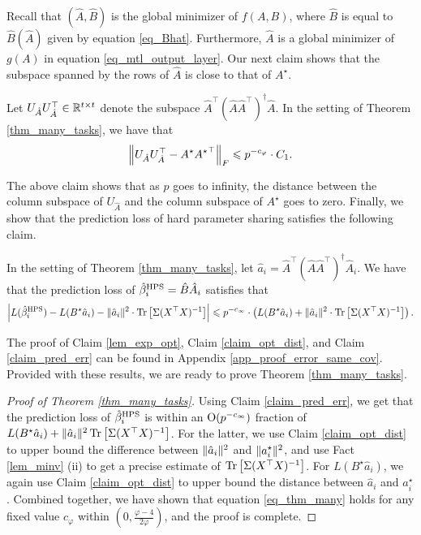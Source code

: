 	Recall that $(\hat{A}, \hat{B})$ is the global minimizer of $f(A, B)$, where $\hat{B}$ is equal to $\hat{B}(\hat{A})$ given by equation \eqref{eq_Bhat}.
	Furthermore, $\hat{A}$ is a global minimizer of $g(A)$ in equation \eqref{eq_mtl_output_layer}.
	Our next claim shows that the subspace spanned by the rows of $\hat{A}$ is close to that of $A^{\star}$.
	\begin{claim}\label{claim_opt_dist}
		Let $U_{\hat{A}} U_{\hat{A}}^{\top} \in\mathbb{R}^{t\times t}$ denote the subspace $\hat{A}^{\top} (\hat{A}\hat{A}^{\top})^{\dagger} \hat{A}$.
		In the setting of Theorem \ref{thm_many_tasks}, we have that
		\[ \left\| U_{\hat{A}} U_{\hat{A}}^{\top} - A^{\star} {A^{\star}}^{\top} \right\|_{F}
				\leqslant  p^{-c_{\varphi}} \cdot C_1. \]
	\end{claim}
	The above claim shows that as $p$ goes to infinity, the distance between the column subspace of $U_{\hat{A}}$ and the column subspace of ${A^{\star}}$ goes to zero.
	Finally, we show that the prediction loss of hard parameter sharing satisfies the following claim.
	\begin{claim}\label{claim_pred_err}
		In the setting of Theorem \ref{thm_many_tasks},
		let $\hat{a}_i = \hat{A}^{\top} (\hat{A}\hat{A}^{\top})^{\dagger} \hat{A}_i$.
		We have that the prediction loss of $\hat{\beta}_i^{\textup{HPS}} = \hat{B} \hat{A}_i$ satisfies that
		\begin{align*}
			{\left| {L(\hat{\beta}_i^{\textup{HPS}}) - L(B^{\star} \hat{a}_i) - \|\hat{a}_i\|^2 \cdot \operatorname{Tr}\left[\Sigma (X^{\top}X)^{-1}\right]} \right|}
			\leqslant  p^{-c_\infty} \cdot \left({L(B^{\star} \hat{a}_i) + \|\hat{a}_i\|^2 \cdot \operatorname{Tr}\left[\Sigma (X^{\top}X)^{-1}\right]}\right).
		\end{align*}
	\end{claim}
	The proof of Claim \ref{lem_exp_opt}, Claim \ref{claim_opt_dist}, and Claim \ref{claim_pred_err} can be found in Appendix \ref{app_proof_error_same_cov}.
	Provided with these results, we are ready to prove Theorem \ref{thm_many_tasks}.
	\begin{proof}[Proof of Theorem \ref{thm_many_tasks}]
		Using Claim \ref{claim_pred_err}, we get that the prediction loss of $\hat{\beta}_i^{\textup{HPS}}$ is within an $\operatorname{O}(p^{-c_{\infty}})$ fraction of $L(B^{\star}\hat{a}_i)+\|\hat{a}_i\|^2 \operatorname{Tr}\left[\Sigma(X^{\top}X)^{-1}\right]$.
		For the latter, we use Claim \ref{claim_opt_dist} to upper bound the difference between $\|\hat{a}_i\|^2$ and $\|a_i^{\star}\|^2$, and use Fact \ref{lem_minv} (ii) to get a precise estimate of $\operatorname{Tr}\left[\Sigma (X^{\top}X)^{-1}\right]$.
		For $L(B^{\star}\hat{a}_i)$, we again use Claim \ref{claim_opt_dist} to upper bound the distance between $\hat{a}_i$ and $a_i^{\star}$.
		Combined together, we have shown that equation \eqref{eq_thm_many} holds for any fixed value $c_{\varphi}$ within $(0, \frac{\varphi-4}{2\varphi})$, and the proof is complete.
	\end{proof}

